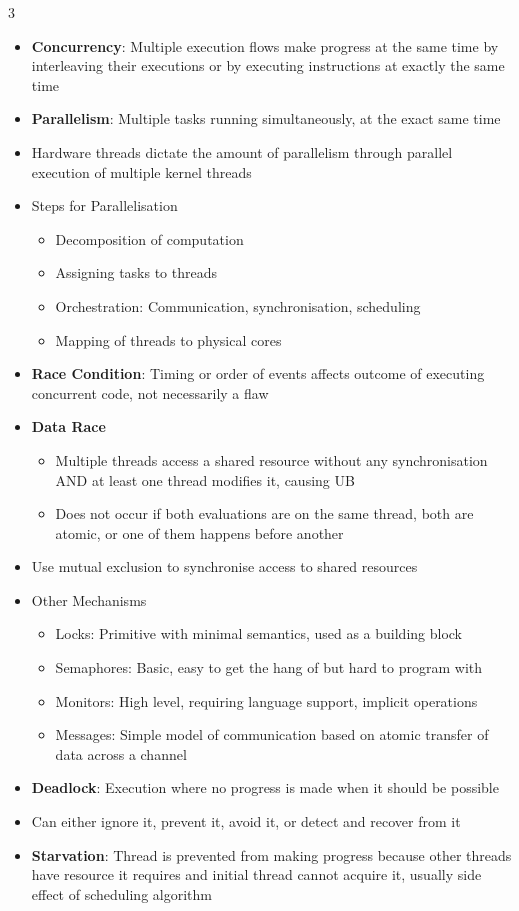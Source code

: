 \documentclass[10pt, landscape]{article}
\begin{document}
\begin{multicols*}{3}
\begin{itemize}
    \item \textbf{Concurrency}: Multiple execution flows make progress at the same time by interleaving their executions or by executing instructions at exactly the same time
    \item \textbf{Parallelism}: Multiple tasks running simultaneously, at the exact same time
    \item Hardware threads dictate the amount of parallelism through parallel execution of multiple kernel threads
    \item Steps for Parallelisation
    \begin{itemize}
        \item Decomposition of computation
        \item Assigning tasks to threads
        \item Orchestration: Communication, synchronisation, scheduling
        \item Mapping of threads to physical cores
    \end{itemize}
    \item \textbf{Race Condition}: Timing or order of events affects outcome of executing concurrent code, not necessarily a flaw
    \item \textbf{Data Race}
    \begin{itemize}
        \item Multiple threads access a shared resource without any synchronisation AND at least one thread modifies it, causing UB
        \item Does not occur if both evaluations are on the same thread, both are atomic, or one of them happens before another
    \end{itemize}
    \item Use mutual exclusion to synchronise access to shared resources
    \item Other Mechanisms
    \begin{itemize}
        \item Locks: Primitive with minimal semantics, used as a building block
        \item Semaphores: Basic, easy to get the hang of but hard to program with
        \item Monitors: High level, requiring language support, implicit operations
        \item Messages: Simple model of communication based on atomic transfer of data across a channel
    \end{itemize}
    \item \textbf{Deadlock}: Execution where no progress is made when it should be possible
    \item Can either ignore it, prevent it, avoid it, or detect and recover from it
    \item \textbf{Starvation}: Thread is prevented from making progress because other threads have resource it requires and initial thread cannot acquire it, usually side effect of scheduling algorithm
\end{itemize}


\end{multicols*}
\end{document}
